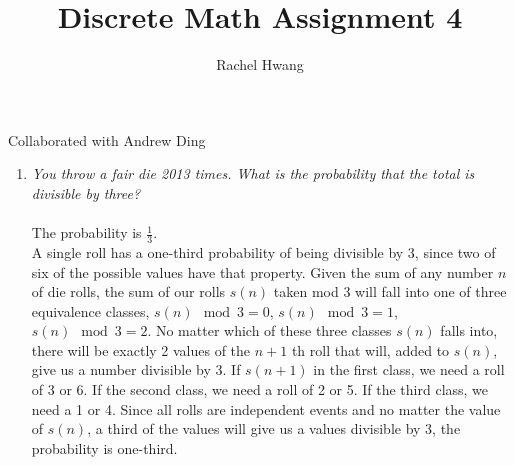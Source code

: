 \documentclass[12pt]{article}
\title{Discrete Math Assignment 4}
\author{Rachel Hwang}
\begin{document}
\maketitle

Collaborated with Andrew Ding \\
\begin{enumerate}
\item\emph{You throw a fair die 2013 times. What is the probability that the total is divisible by three?} \\
\\
The probability is $\frac{1}{3}$.\\

A single roll has a one-third probability of being divisible by 3, since two of six of the possible values have that property. Given the sum of any number $n$ of die rolls, the sum of our rolls $s(n)$ taken mod 3 will fall into one of three equivalence classes, $s(n) \mod 3 = 0$, $s(n) \mod 3 = 1$, $s(n) \mod 3 = 2$. No matter which of these three classes $s(n)$ falls into, there will be exactly 2 values of the $n+1$ th roll that will, added to $s(n)$, give us a number divisible by 3. If $s(n+1)$ in the first class, we need a roll of 3 or 6. If the second class, we need a roll of 2 or 5. If the third class, we need a 1 or 4. Since all rolls are independent events and no matter the value of $s(n)$, a third of the values will give us a values divisible by 3, the probability is one-third.
 

\end{enumerate}
\end{document}
